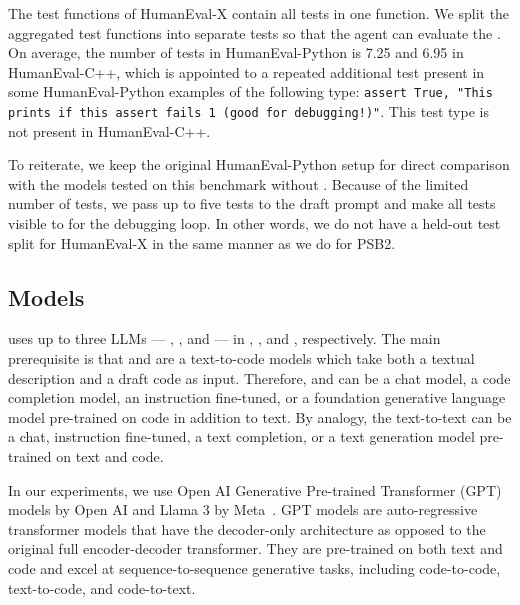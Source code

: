 The test functions of HumanEval-X contain all tests in one function. We split the aggregated test functions into separate tests so that the \rank{} agent can evaluate the . 
On average, the number of tests in HumanEval-Python is 7.25 and 6.95 in HumanEval-C++, which is appointed to a repeated additional test present in some HumanEval-Python examples of the following type: \texttt{assert True, "This prints if this assert fails 1 (good for debugging!)"}.
This test type is not present in HumanEval-C++.

To reiterate, we keep the original HumanEval-Python setup for direct comparison with the models tested on this benchmark without \method{}. 
Because of the limited number of tests, we pass up to five tests to the draft prompt and make all tests visible to \method{} for the debugging loop. 
In other words, we do not have a held-out test split for HumanEval-X in the same manner as we do for PSB2.


\subsection{Models}
\label{sec:models}

\method{} uses up to three LLMs --- \synthmodelnoargs{}, \textmodelnoargs{}, and \debugmodelnoargs{} ---
in \synthesize{}, \instructllm{}, and \debug{}, respectively. 
The main prerequisite is that \synthmodelnoargs{} and \debugmodelnoargs{} are a text-to-code models which take both a textual description and a draft code as input.
Therefore, \synthmodelnoargs{} and \debugmodelnoargs{} can be a chat model, a code completion model, an instruction fine-tuned, or a foundation generative language model pre-trained on code in addition to text. 
By analogy, the text-to-text \textmodelnoargs{} can be a chat, instruction fine-tuned, a text completion, or a text generation model pre-trained on text and code.

In our experiments, we use Open AI Generative Pre-trained Transformer (GPT) models by Open AI and Llama 3 by Meta~\cite{roziere2023:code}. 
GPT models are auto-regressive transformer models that have the decoder-only architecture as opposed to the original full encoder-decoder transformer.
They are pre-trained on both text and code and excel at sequence-to-sequence generative tasks, including code-to-code, text-to-code, and code-to-text.

